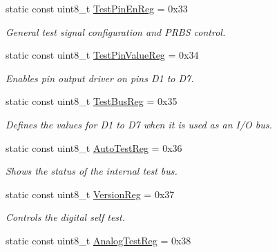 \begin{DoxyCompactItemize}
static const uint8\+\_\+t \hyperlink{classMFRC522_a0b73879826d5984c9ce1c9b8eb7403b2}{Test\+Pin\+En\+Reg} = 0x33
\begin{DoxyCompactList}\small\item\em General test signal configuration and P\+R\+BS control. \end{DoxyCompactList}\item 
\mbox{\label{classMFRC522_ad5b177065c774237eb2756a7209ebaac}} 
static const uint8\+\_\+t \hyperlink{classMFRC522_ad5b177065c774237eb2756a7209ebaac}{Test\+Pin\+Value\+Reg} = 0x34
\begin{DoxyCompactList}\small\item\em Enables pin output driver on pins D1 to D7. \end{DoxyCompactList}\item 
\mbox{\label{classMFRC522_acced8d7ea05d430a8f48ee5d30c63443}} 
static const uint8\+\_\+t \hyperlink{classMFRC522_acced8d7ea05d430a8f48ee5d30c63443}{Test\+Bus\+Reg} = 0x35
\begin{DoxyCompactList}\small\item\em Defines the values for D1 to D7 when it is used as an I/O bus. \end{DoxyCompactList}\item 
\mbox{\label{classMFRC522_a763839e9e665049bc5ea0c754aaa47a4}} 
static const uint8\+\_\+t \hyperlink{classMFRC522_a763839e9e665049bc5ea0c754aaa47a4}{Auto\+Test\+Reg} = 0x36
\begin{DoxyCompactList}\small\item\em Shows the status of the internal test bus. \end{DoxyCompactList}\item 
\mbox{\label{classMFRC522_a87c131b5dc310dd451ed2339bc2acf04}} 
static const uint8\+\_\+t \hyperlink{classMFRC522_a87c131b5dc310dd451ed2339bc2acf04}{Version\+Reg} = 0x37
\begin{DoxyCompactList}\small\item\em Controls the digital self test. \end{DoxyCompactList}\item 
\mbox{\label{classMFRC522_ad05c5ce439020bd080a2102804e3ad96}} 
static const uint8\+\_\+t \hyperlink{classMFRC522_ad05c5ce439020bd080a2102804e3ad96}{Analog\+Test\+Reg} = 0x38

\end{DoxyCompactItemize}
